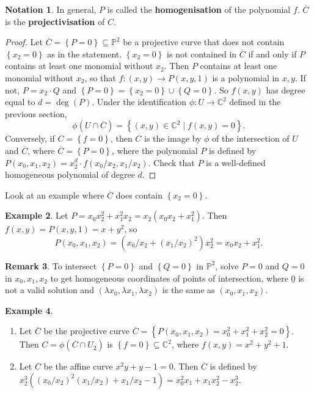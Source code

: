 \documentclass{article}
\newcommand{\C}{\mathbb{C}}
\renewcommand{\P}{\mathbb{P}}
\newcommand{\rb}[1]{\left( #1 \right)}
\newcommand{\cb}[1]{\left\{ #1 \right\}}
\theoremstyle{definition}\newtheorem{definition}{Definition}[section]
\theoremstyle{definition}\newtheorem{notation}[definition]{Notation}
\theoremstyle{definition}\newtheorem{remark}[definition]{Remark}
\theoremstyle{definition}\newtheorem{example}[definition]{Example}
\theoremstyle{definition}\newtheorem{fact}{Fact}
\theoremstyle{definition}\newtheorem{exercise}{Exercise}
\begin{document}
\begin{notation}
In general, $ P $ is called the \textbf{homogenisation} of the polynomial $ f $. $ \overline{C} $ is the \textbf{projectivisation} of $ C $.
\end{notation}

\begin{proof}
Let $ \overline{C} = \cb{P = 0} \subseteq \P^2 $ be a projective curve that does not contain $ \cb{x_2 = 0} $ as in the statement. $ \cb{x_2 = 0} $ is not contained in $ \overline{C} $ if and only if $ P $ contains at least one monomial without $ x_2 $. Then $ P $ contains at least one monomial without $ x_2 $, so that $ f : \rb{x, y} \to P\rb{x, y, 1} $ is a polynomial in $ x, y $. If not, $ P = x_2 \cdot Q $ and $ \cb{P = 0} = \cb{x_2 = 0} \cup \cb{Q = 0} $. So $ f\rb{x, y} $ has degree equal to $ d = \deg\rb{P} $. Under the identification $ \phi : U \to \C^2 $ defined in the previous section,
$$ \phi\rb{U \cap \overline{C}} = \cb{\rb{x, y} \in \C^2 \mid f\rb{x, y} = 0}. $$
Conversely, if $ C = \cb{f = 0} $, then $ C $ is the image by $ \phi $ of the intersection of $ U $ and $ \overline{C} $, where $ \overline{C} = \cb{P = 0} $, where the polynomial $ P $ is defined by $ P\rb{x_0, x_1, x_2} = x_2^d \cdot f\rb{x_0 / x_2, x_1 / x_2} $. Check that $ P $ is a well-defined homogeneous polynomial of degree $ d $.
\end{proof}

Look at an example where $ \overline{C} $ does contain $ \cb{x_2 = 0} $.

\begin{example}
Let $ P = x_0x_2^2 + x_1^2x_2 = x_2\rb{x_0x_2 + x_1^2} $. Then $ f\rb{x, y} = P\rb{x, y, 1} = x + y^2 $, so
$$ P\rb{x_0, x_1, x_2} = \rb{x_0 / x_2 + \rb{x_1 / x_2}^2}x_2^2 = x_0x_2 + x_1^2. $$
\end{example}

\begin{remark}
To intersect $ \cb{P = 0} $ and $ \cb{Q = 0} $ in $ \P^2 $, solve $ P = 0 $ and $ Q = 0 $ in $ x_0, x_1, x_2 $ to get homogeneous coordinates of points of intersection, where $ \underline{0} $ is not a valid solution and $ \rb{\lambda x_0, \lambda x_1, \lambda x_2} $ is the same as $ \rb{x_0, x_1, x_2} $.
\end{remark}

\begin{example}
\hfill
\begin{enumerate}
\item Let $ \overline{C} $ be the projective curve $ \overline{C} = \cb{P\rb{x_0, x_1, x_2} = x_0^2 + x_1^2 + x_2^2 = 0} $. Then $ C = \phi\rb{\overline{C} \cap U_2} $ is $ \cb{f = 0} \subseteq \C^2 $, where $ f\rb{x, y} = x^2 + y^2 + 1 $.
\item Let $ C $ be the affine curve $ x^2y + y - 1 = 0 $. Then $ \overline{C} $ is defined by $ x_2^3\rb{\rb{x_0 / x_2}^2\rb{x_1 / x_2} + x_1 / x_2 - 1} = x_0^2x_1 + x_1x_2^2 - x_2^3 $.
\end{enumerate}
\end{example}
\end{document}
